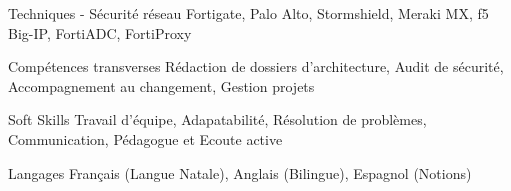 

\begin{cvskills}

  \cvskill
    {Techniques - Sécurité réseau} %
    {Fortigate, Palo Alto, Stormshield, Meraki MX, f5 Big-IP, FortiADC, FortiProxy} %

  \cvskill
    {Compétences transverses} %
    {Rédaction de dossiers d'architecture, Audit de sécurité, Accompagnement au changement, Gestion projets} %
    
  \cvskill
    {Soft Skills} %
    {Travail d'équipe, Adapatabilité, Résolution de problèmes, Communication, Pédagogue et Ecoute active} %

  \cvskill
    {Langages} %
    {Français (Langue Natale), Anglais (Bilingue), Espagnol (Notions)} %

\end{cvskills}
